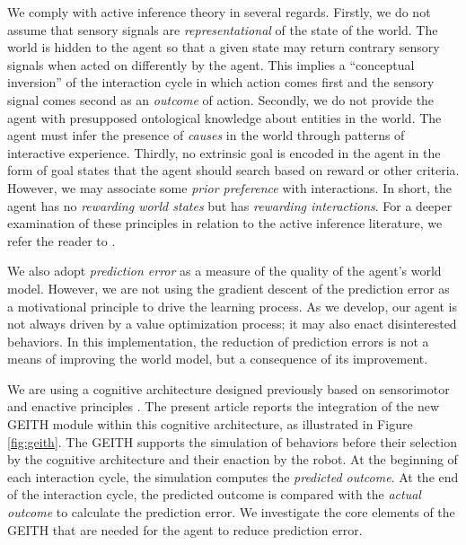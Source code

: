 \documentclass[runningheads]{llncs}
\begin{document}
We comply with active inference theory in several regards. 
Firstly, we do not assume that sensory signals are \textit{representational} of the state of the world. 
The world is hidden to the agent so that a given state may return contrary sensory signals when acted on differently by the agent.
This implies a ``conceptual inversion'' of the interaction cycle in which action comes first and the sensory signal comes second as an  \textit{outcome} of action. 
Secondly, we do not provide the agent with presupposed ontological knowledge about entities in the world. 
The agent must infer the 
presence of \textit{causes} in the world 
through patterns of interactive experience. 
Thirdly, no extrinsic goal is encoded in the agent in the form of goal states that the agent should search based on reward or other criteria. 
However, we may associate some \textit{prior preference} with interactions. 
In short, the agent has no \textit{rewarding world states} but has \textit{rewarding interactions}. %
For a deeper examination of these principles in relation to the active inference literature, we refer the reader to 
\cite{georgeon_artificial_2024}.

We also adopt \textit{prediction error} as a measure of the quality of the agent's world model. %
However, we are not using the gradient descent of the prediction error as a motivational principle to drive the learning process. 
As we develop, our agent is not always driven by a value optimization process; it may also enact disinterested behaviors.
In this implementation, the reduction of prediction errors is not a means of improving the world model, but a consequence of its improvement.

We are using a cognitive architecture 
designed previously 
based on sensorimotor and enactive principles \cite{georgeon_artificial_2024}. 
The present article reports the integration of the new GEITH module within this cognitive architecture, as illustrated in Figure \ref{fig:geith}. 
The GEITH supports the simulation of behaviors before their selection by the cognitive architecture and their enaction by the robot. 
At the beginning of each interaction cycle, the simulation computes the \textit{predicted outcome}.
At the end of the interaction cycle, the predicted outcome is compared with the \textit{actual outcome} to calculate the prediction error.   
We investigate the core elements of the GEITH that are needed for the agent to reduce prediction error. 
\end{document}
